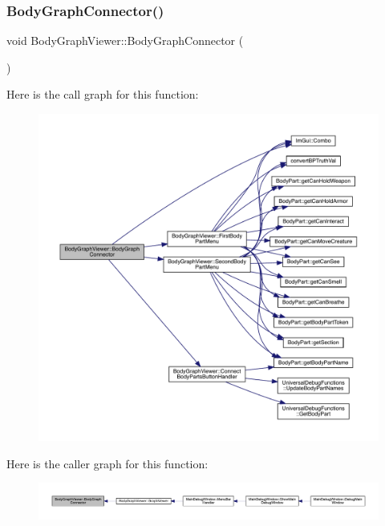 \subsubsection{\texorpdfstring{Body\+Graph\+Connector()}{BodyGraphConnector()}}
{\footnotesize\ttfamily void Body\+Graph\+Viewer\+::\+Body\+Graph\+Connector (\begin{DoxyParamCaption}{ }\end{DoxyParamCaption})}

Here is the call graph for this function\+:
\nopagebreak
\begin{figure}[H]
\begin{center}
\leavevmode
\includegraphics[width=350pt]{df/d9e/namespace_body_graph_viewer_a269151dfadc20a939854d1187a7ef914_cgraph}
\end{center}
\end{figure}
Here is the caller graph for this function\+:
\nopagebreak
\begin{figure}[H]
\begin{center}
\leavevmode
\includegraphics[width=350pt]{df/d9e/namespace_body_graph_viewer_a269151dfadc20a939854d1187a7ef914_icgraph}
\end{center}
\end{figure}
\mbox{\label{namespace_body_graph_viewer_a0afc56c4f90396362e310ee53d40658b}} 
